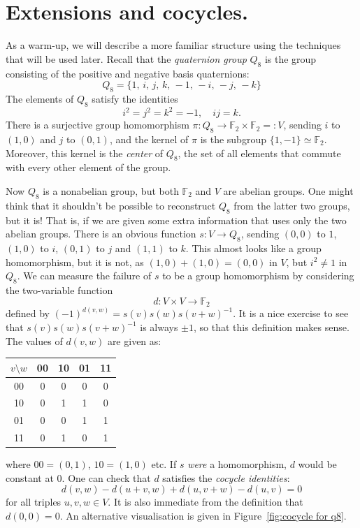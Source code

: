 \documentclass{article}
\theoremstyle{plain}
\theoremstyle{definition}
\def \FF {\mathbb{F}}
\begin{document}
\section{Extensions and cocycles.}

As a warm-up, we will describe a more familiar structure using the techniques that will be used later. 
Recall that the \emph{quaternion group} $Q_8$ is the group consisting of the positive and negative basis quaternions:
\[
	Q_8 = \{1,\, i,\, j,\, k,\,-1,\, -i,\, -j,\, -k\}
\]
The elements of $Q_8$ satisfy the identities
\[
	i^2 = j^2 = k^2 = -1, \quad ij=k.
\]
There is a surjective group homomorphism $\pi\colon Q_8 \to \FF_2 \times \FF_2 =: V$, sending $i$ to $(1,0)$ and $j$ to $(0,1)$, and the kernel of $\pi$ is the subgroup $\{1,-1\}\simeq \FF_2$.
Moreover, this kernel is the \emph{center} of $Q_8$, the set of all elements that commute with every other element of the group.

Now $Q_8$ is a nonabelian group, but both $\FF_2$ and $V$ are abelian groups.
One might think that it shouldn't be possible to reconstruct $Q_8$ from the latter two groups, but it is! 
That is, if we are given some extra information that uses only the two abelian groups.
There is an obvious function $s\colon V \to Q_8$, sending $(0,0)$ to $1$, $(1,0)$ to $i$, $(0,1)$ to $j$ and $(1,1)$ to $k$.
This almost looks like a group homomorphism, but it is not, as $(1,0) + (1,0) = (0,0)$ in $V$, but $i^2 \not= 1$ in $Q_8$.
We can measure the failure of $s$ to be a group homomorphism by considering the two-variable function
\[
	d\colon V \times V \to \FF_2
\]
defined by $ (-1)^{d(v,w)} = s(v)s(w)s(v+w)^{-1}$. 
It is a nice exercise to see that $s(v)s(w)s(v+w)^{-1}$ is always $\pm 1$, so that this definition makes sense. The values of $d(v,w)$ are given as:

\begin{center}
\begin{tabular*}{0.35\textwidth}{c|cccc}
$v\setminus w$&00&10&01&11\\
\hline
	00		& 0& 0& 0& 0\\
	10		& 0& 1& 1& 0\\
	01		& 0& 0& 1& 1\\
	11		& 0& 1& 0& 1\\
\end{tabular*}
\end{center}
where $00=(0,1)$, $10=(1,0)$ etc.
If $s$ \emph{were} a homomorphism, $d$ would be constant at $0$.
One can check that $d$ satisfies the \emph{cocycle identities}:
\[
	d(v,w)-d(u+v,w)+d(u,v+w)-d(u,v) = 0
\]
for all triples $u,v,w\in V$. It is also immediate from the definition that $d(0,0)=0$.
An alternative visualisation is given in Figure~\ref{fig:cocycle for q8}.
\end{document}
